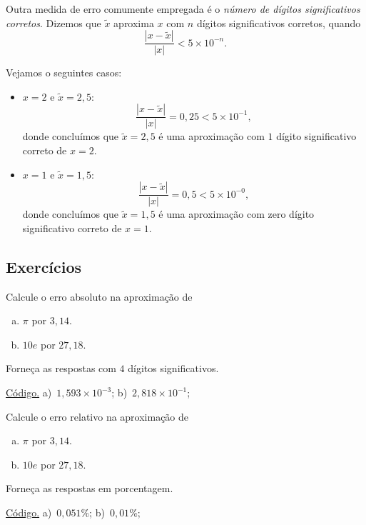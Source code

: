 Outra medida de erro comumente empregada é o \emph{número de dígitos significativos corretos}. Dizemos que $\tilde{x}$ aproxima $x$ com $n$ dígitos significativos corretos, quando
\begin{equation}
  \frac{|x - \tilde{x}|}{|x|} < 5\times 10^{-n}.
\end{equation}

\begin{ex}\label{ex:numdigsigcorr}
  Vejamos o seguintes casos:
  \begin{itemize}
  \item $x=2$ e $\tilde{x} = 2,5$:
    \begin{equation}
      \frac{|x - \tilde{x}|}{|x|} = 0,25 < 5\times 10^{-1},
    \end{equation}
donde concluímos que $\tilde{x}=2,5$ é uma aproximação com $1$ dígito significativo correto de $x=2$.
  \item $x=1$ e $\tilde{x} = 1,5$:
    \begin{equation}
      \frac{|x - \tilde{x}|}{|x|} = 0,5 < 5\times 10^{-0},
    \end{equation}
donde concluímos que $\tilde{x}=1,5$ é uma aproximação com zero dígito significativo correto de $x=1$.
  \end{itemize}
\end{ex}

\subsection*{Exercícios}

\begin{exer}\label{exer:erro_abs}
  Calcule o erro absoluto na aproximação de
  \begin{enumerate}[a)]
  \item $\pi$ por $3,14$.
  \item $10e$ por $27,18$.
  \end{enumerate}
  Forneça as respostas com $4$ dígitos significativos.
\end{exer}
\begin{resp}
  \ifisoctave 
  \href{https://github.com/phkonzen/notas/blob/master/src/MatematicaNumerica/cap_aritm/dados/exer_erro_abs/exer_erro_abs.m}{Código.} 
  \fi
  a)~$1,593\times 10^{-3}$; b)~$2,818\times 10^{-1}$;
\end{resp}

\begin{exer}\label{exer:erro_rel}
  Calcule o erro relativo na aproximação de
  \begin{enumerate}[a)]
  \item $\pi$ por $3,14$.
  \item $10e$ por $27,18$.
  \end{enumerate}
  Forneça as respostas em porcentagem.
\end{exer}
\begin{resp}
  \ifisoctave 
  \href{https://github.com/phkonzen/notas/blob/master/src/MatematicaNumerica/cap_aritm/dados/exer_erro_rel/exer_erro_rel.m}{Código.} 
  \fi
  a)~$0,051\%$; b)~$0,01\%$;
\end{resp}

